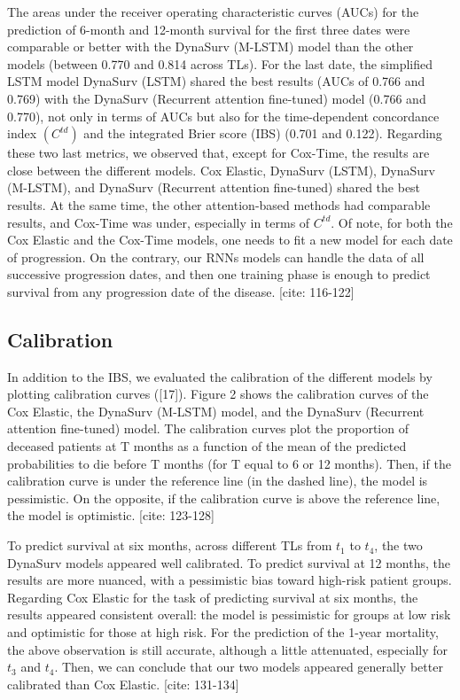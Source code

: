 \documentclass[a4paper,10pt]{article}
\begin{document}
The areas under the receiver operating characteristic curves (AUCs) for the prediction of 6-month and 12-month survival for the first three dates were comparable or better with the DynaSurv (M-LSTM) model than the other models (between 0.770 and 0.814 across TLs). For the last date, the simplified LSTM model DynaSurv (LSTM) shared the best results (AUCs of 0.766 and 0.769) with the DynaSurv (Recurrent attention fine-tuned) model (0.766 and 0.770), not only in terms of AUCs but also for the time-dependent concordance index $(C^{td})$ and the integrated Brier score (IBS) (0.701 and 0.122). Regarding these two last metrics, we observed that, except for Cox-Time, the results are close between the different models. Cox Elastic, DynaSurv (LSTM), DynaSurv (M-LSTM), and DynaSurv (Recurrent attention fine-tuned) shared the best results. At the same time, the other attention-based methods had comparable results, and Cox-Time was under, especially in terms of $C^{td}$. Of note, for both the Cox Elastic and the Cox-Time models, one needs to fit a new model for each date of progression. On the contrary, our RNNs models can handle the data of all successive progression dates, and then one training phase is enough to predict survival from any progression date of the disease. [cite: 116-122]

\subsection{Calibration}
In addition to the IBS, we evaluated the calibration of the different models by plotting calibration curves ([17]). Figure 2 shows the calibration curves of the Cox Elastic, the DynaSurv (M-LSTM) model, and the DynaSurv (Recurrent attention fine-tuned) model. The calibration curves plot the proportion of deceased patients at T months as a function of the mean of the predicted probabilities to die before T months (for T equal to 6 or 12 months). Then, if the calibration curve is under the reference line (in the dashed line), the model is pessimistic. On the opposite, if the calibration curve is above the reference line, the model is optimistic. [cite: 123-128]

To predict survival at six months, across different TLs from $t_1$ to $t_4$, the two DynaSurv models appeared well calibrated. To predict survival at 12 months, the results are more nuanced, with a pessimistic bias toward high-risk patient groups. Regarding Cox Elastic for the task of predicting survival at six months, the results appeared consistent overall: the model is pessimistic for groups at low risk and optimistic for those at high risk. For the prediction of the 1-year mortality, the above observation is still accurate, although a little attenuated, especially for $t_3$ and $t_4$. Then, we can conclude that our two models appeared generally better calibrated than Cox Elastic. [cite: 131-134]
\end{document}
